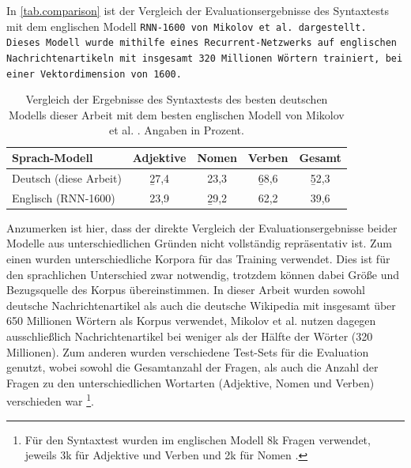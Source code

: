 
In \autoref{tab.comparison} ist der Vergleich der Evaluationsergebnisse des Syntaxtests mit dem englischen Modell \tt{RNN-1600} von Mikolov et al. dargestellt. Dieses Modell wurde mithilfe eines Recurrent-Netzwerks auf englischen Nachrichtenartikeln mit insgesamt 320 Millionen Wörtern trainiert, bei einer Vektordimension von 1600.

\begin{table}[!ht]\vspace{1ex}\small\centering{}\begin{tabular}{|l|c|c|c|c|}
\hline Sprach-Modell & Adjektive & Nomen & Verben & Gesamt \\ \hline\hline
Deutsch (diese Arbeit) & \b{27,4} &    23,3  & \b{68,6} & \b{52,3} \\ \hline
Englisch (RNN-1600)    &    23,9  & \b{29,2} &    62,2  &    39,6  \\ \hline
\end{tabular}
\caption[Vergleich: deutsches und englisches Sprachmodell]{\label{tab.comparison}Vergleich der Ergebnisse des Syntaxtests des besten deutschen Modells dieser Arbeit mit dem besten englischen Modell von Mikolov et al. \citep{Mikolov2012}. Angaben in Prozent.}
\vspace{1ex}\end{table}

Anzumerken ist hier, dass der direkte Vergleich der Evaluationsergebnisse beider Modelle aus unterschiedlichen Gründen nicht vollständig repräsentativ ist. Zum einen wurden unterschiedliche Korpora für das Training verwendet. Dies ist für den sprachlichen Unterschied zwar notwendig, trotzdem können dabei Größe und Bezugsquelle des Korpus übereinstimmen. In dieser Arbeit wurden sowohl deutsche Nachrichtenartikel als auch die deutsche Wikipedia mit insgesamt über 650 Millionen Wörtern als Korpus verwendet, Mikolov et al. nutzen dagegen ausschließlich Nachrichtenartikel bei weniger als der Hälfte der Wörter (320 Millionen). Zum anderen wurden verschiedene Test-Sets für die Evaluation genutzt, wobei sowohl die Gesamtanzahl der Fragen, als auch die Anzahl der Fragen zu den unterschiedlichen Wortarten (Adjektive, Nomen und Verben) verschieden war \footnote{Für den Syntaxtest wurden im englischen Modell 8k Fragen verwendet, jeweils 3k für Adjektive und Verben und 2k für Nomen \citep{Mikolov2012}.}.

